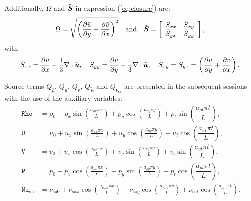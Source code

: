 \documentclass[10pt]{article}
\newcommand{\diff}[2] {\dfrac{\partial #1}{\partial #2}}
\newcommand{\bv}[1]{\ensuremath{\mbox{\boldmath$ #1 $}}}
\newcommand{\Rho}{\,\mathtt{Rho}}
\newcommand{\PP}{\,\mathtt{P}}
\newcommand{\U}{\,\mathtt{U}}
\newcommand{\V}{\,\mathtt{V}}
\newcommand{\Nu}{\,\mathtt{Nu_{sa}}}
\newcommand{\sa}{\nu_{\mathrm{sa}}}
\newcommand{\tsa}{\mathrm{sa}}
\newcommand{\brho}{\bar{\rho}}
\newcommand{\tu}{\tilde{u}}
\newcommand{\tv}{\tilde{v}}
\newcommand{\tS}{\tilde{S}}
\newcommand{\tE}{\tilde{E}}
\begin{document}
Additionally, $\Omega$ and $\tilde{\bv{S}}$ in expression (\ref{eq:closure}) are:
\begin{gather*}
\label{eq:closure03}
 \Omega = \sqrt{\left( \diff{\tilde{u}}{y} - \diff{\tilde{v}}{x}\right)^2} \quad \mbox{and}\quad 
\tilde{\bv{S}}=\left[
\begin{array}{cc}
\tS_{xx} & \tS_{xy}\\
\tS_{yx} & \tS_{yy}
\end{array}\right] , 
\end{gather*}
with
\begin{equation*}
\tS_{xx}= \diff{\tilde{u}}{x}-\dfrac{1}{3} \nabla \cdot \tilde{\bv{u}},\quad \tS_{yy}= \diff{\tilde{v}}{y}-\dfrac{1}{3} \nabla \cdot \tilde{\bv{u}}, \quad \tS_{xy}= \tS_{yx}= \left( \diff{\tilde{u}}{y} + \diff{\tilde{v}}{x}\right).\\
\end{equation*}




Source terms $Q_{\brho}$, $Q_{\tu}$, $Q_{\tv}$, $Q_{\tE}$ and $Q_{\sa}$ are presented in the subsequent sessions with the use of the auxiliary variables:
\begin{equation}
 \begin{split}
\label{eq:aux_2d}
\Rho &= \rho_{0}+ \rho_{x} \sin\left(\frac{a_{ \rho x} \pi x}{L}\right)+ \rho_{y} \cos\left(\frac{a_{ \rho y} \pi y}{L}\right)+ \rho_t \sin\left(\dfrac{a_{\rho t} \pi t}{L}\right),\\
\U &= u_{0}+u_{x} \sin\left(\frac{a_{u x} \pi x}{L}\right)+u_{y} \cos\left(\frac{a_{u y} \pi y}{L}\right) + u_t \cos\left(\dfrac{a_{u t} \pi t}{L}\right),\\
\V &= v_{0}+v_{x} \cos\left(\frac{a_{v x} \pi x}{L}\right)+v_{y} \sin\left(\frac{a_{v y} \pi y}{L}\right)+ v_t \sin\left(\dfrac{a_{v t} \pi t}{L}\right),\\
\PP &= p_{0}+p_{x} \cos\left(\frac{a_{p x} \pi x}{L}\right)+p_{y} \sin\left(\frac{a_{p y} \pi y}{L}\right)+ p_t \cos\left(\dfrac{a_{p t} \pi t}{L}\right),\\
\Nu &= \nu_{\tsa 0} +\nu_{\tsa x} \cos\left(\frac{a_{\sa x} \pi x}{L}\right) + \nu_{\tsa y} \cos\left(\frac{a_{\sa y} \pi y}{L}\right) + \nu_{\tsa t}\cos\left(\frac{a_{\sa t} \pi t}{L}\right).
\end{split}
\end{equation}
\end{document}
